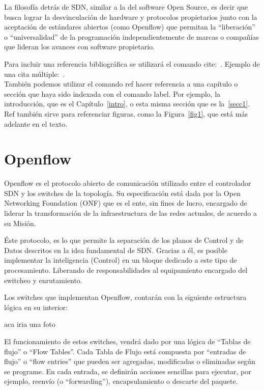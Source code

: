 \documentclass[12pt,a4paper,oneside]{book}
\begin{document}
La filosofía detrás de SDN, similar a la del software Open Source, es decir que busca lograr la desvinculación de hardware y protocolos propietarios junto con la aceptación de estándares abiertos (como Openflow) que permitan la “liberación” o “universalidad” de la programación independientemente de marcas o compañías que lideran los avances con software propietario. 





Para incluir una referencia bibliográfica se utilizará el comando cite:~\cite{girard1989}.
Ejemplo de una cita múltiple:~\cite{ranta2012,tcs2015}.\\

También podemos utilizar el comando ref hacer referencia a una capítulo o sección que haya sido indexada con el comando label. Por ejemplo, la introducción, que es el Capítulo~\ref{intro}, o esta misma sección que es la~\ref{secc1}. Ref también sirve para referenciar figuras, como la Figura~\ref{fig1}, que está más adelante en el texto.



\section{Openflow}
\label{marco_openflow}

Openflow es el protocolo abierto de comunicación utilizado entre el controlador SDN y los switches de la topología. Su especificación está dada por la Open Networking Foundation (ONF) que es el ente, sin fines de lucro, encargado de liderar la transformación de la infraestructura de las redes actuales, de acuerdo a su Misión.

Éste protocolo, es lo que permite la separación de los planos de Control y de Datos descritos en la idea fundamental de SDN. Gracias a él, es posible implementar la inteligencia (Control) en un bloque dedicado a este tipo de procesamiento. Liberando de responsabilidades al equipamiento encargado del switcheo y enrutamiento.

	Los switches que implementan Openflow, contarán con la siguiente estructura lógica en su interior:

aca iria una foto


El funcionamiento de estos switches, vendrá dado por una lógica de “Tablas de flujo” o “Flow Tables”. Cada Tabla de Flujo está compuesta por “entradas de flujo” o “flow entries” que pueden ser agregadas, modificadas o eliminadas según se programe. En cada entrada, se definirán acciones sencillas para ejecutar, por ejemplo, reenvío (o “forwarding”), encapsulamiento o descarte del paquete.
\end{document}
